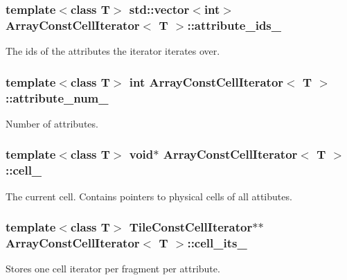 \subsubsection[{attribute\+\_\+ids\+\_\+}]{\setlength{\rightskip}{0pt plus 5cm}template$<$class T$>$ std\+::vector$<$int$>$ {\bf Array\+Const\+Cell\+Iterator}$<$ T $>$\+::attribute\+\_\+ids\+\_\+\hspace{0.3cm}{\ttfamily [private]}}\label{classArrayConstCellIterator_ade9afc82aabc6c4d1f915bf9c34adf3a}
The ids of the attributes the iterator iterates over. \hypertarget{classArrayConstCellIterator_a778e82c4aa2d5af0ffa5c56406b5c07b}{}
\subsubsection[{attribute\+\_\+num\+\_\+}]{\setlength{\rightskip}{0pt plus 5cm}template$<$class T$>$ int {\bf Array\+Const\+Cell\+Iterator}$<$ T $>$\+::attribute\+\_\+num\+\_\+\hspace{0.3cm}{\ttfamily [private]}}\label{classArrayConstCellIterator_a778e82c4aa2d5af0ffa5c56406b5c07b}
Number of attributes. \hypertarget{classArrayConstCellIterator_a64b7b4292c4f45fca402db418edb0149}{}
\subsubsection[{cell\+\_\+}]{\setlength{\rightskip}{0pt plus 5cm}template$<$class T$>$ void$\ast$ {\bf Array\+Const\+Cell\+Iterator}$<$ T $>$\+::cell\+\_\+\hspace{0.3cm}{\ttfamily [private]}}\label{classArrayConstCellIterator_a64b7b4292c4f45fca402db418edb0149}
The current cell. Contains pointers to physical cells of all attibutes. \hypertarget{classArrayConstCellIterator_ad0c94b6c8e3696f0a367ebd808d87651}{}
\subsubsection[{cell\+\_\+its\+\_\+}]{\setlength{\rightskip}{0pt plus 5cm}template$<$class T$>$ {\bf Tile\+Const\+Cell\+Iterator}$\ast$$\ast$ {\bf Array\+Const\+Cell\+Iterator}$<$ T $>$\+::cell\+\_\+its\+\_\+\hspace{0.3cm}{\ttfamily [private]}}\label{classArrayConstCellIterator_ad0c94b6c8e3696f0a367ebd808d87651}
Stores one cell iterator per fragment per attribute. \hypertarget{classArrayConstCellIterator_a91da6e73446e17b4c1d2b3670b2c4ec8}{}
